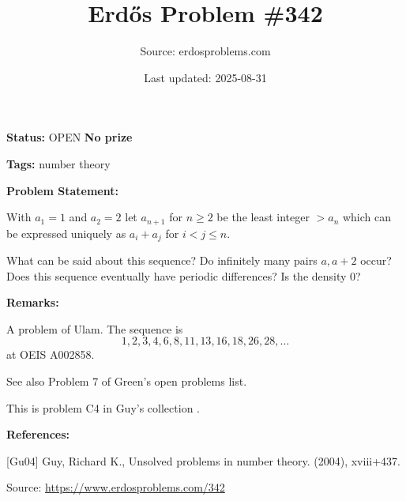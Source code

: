 \documentclass{article}
\title{Erd\H{o}s Problem \#342}
\date{Last updated: 2025-08-31}
\author{Source: erdosproblems.com}
\begin{document}
\maketitle

\noindent\textbf{Status:} OPEN \quad \textbf{No prize}

\noindent\textbf{Tags:} number theory

\medskip
\noindent\textbf{Problem Statement:}

With $a_1=1$ and $a_2=2$ let $a_{n+1}$ for $n\geq 2$ be the least integer $>a_n$ which can be expressed uniquely as $a_i+a_j$ for $i<j\leq n$.

What can be said about this sequence? Do infinitely many pairs $a,a+2$ occur? Does this sequence eventually have periodic differences? Is the density $0$?

\bigskip
\noindent\textbf{Remarks:}

A problem of Ulam. The sequence is\[1,2,3,4,6,8,11,13,16,18,26,28,\ldots\]at OEIS A002858.

See also Problem 7 of Green's open problems list.

This is problem C4 in Guy's collection \cite{Gu04}.

\bigskip
\noindent\textbf{References:}

[Gu04] Guy, Richard K., Unsolved problems in number theory. (2004), xviii+437.

\bigskip
\noindent\small{Source: \url{https://www.erdosproblems.com/342}}
\end{document}
